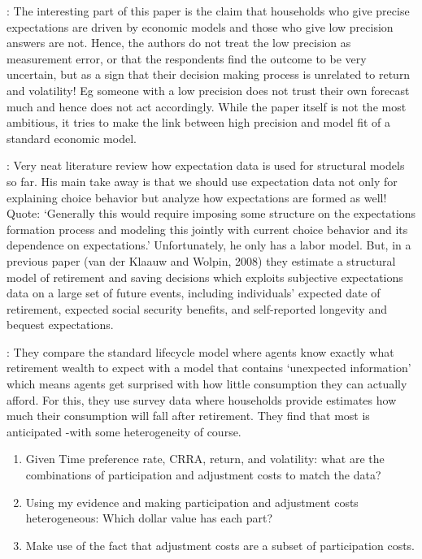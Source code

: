 \documentclass[ProjectABM]{subfiles}
\begin{document}
\cite{DEvG2017_subjective}:
The interesting part of this paper is the claim that households who give precise expectations are driven by economic models and those who give low precision answers are not. Hence, the authors do not treat the low precision as measurement error, or that the respondents find the outcome to be very uncertain, but as a sign that their decision making process is unrelated to return and volatility! Eg someone with a low precision does not trust their own forecast much and hence does not act accordingly. While the paper itself is not the most ambitious, it tries to make the link between high precision and model fit of a standard economic model. 

\cite{vanderKlaauw2012_expectation}: Very neat literature review how expectation data is used for structural models so far. His main take away is that we should use expectation data not only for explaining choice behavior but analyze how expectations are formed as well! Quote: ‘Generally this would require imposing some structure on the expectations formation process and modeling this jointly with current choice behavior and its dependence on expectations.’
Unfortunately, he only has a labor model. But, in a previous paper (van der Klaauw and Wolpin, 2008) they estimate a structural model of retirement and saving decisions which exploits subjective expectations data on a large set of future events, including individuals’ expected date of retirement, expected social security benefits, and self-reported longevity and bequest expectations.

\cite{ACL2007_retirement}: They compare the standard lifecycle model where agents know exactly what retirement wealth to expect with a model that contains ‘unexpected information’ which means agents get surprised with how little consumption they can actually afford. For this, they use survey data where households provide estimates how much their consumption will fall after retirement. They find that most is anticipated -with some heterogeneity of course. 
	
\begin{enumerate}
	\item Given Time preference rate, CRRA, return, and volatility: what are the combinations of participation and adjustment costs to match the data?
	\item Using my evidence and making participation and adjustment costs heterogeneous: Which dollar value has each part?
	\item Make use of the fact that adjustment costs are a subset of participation costs.
\end{enumerate}



\onlyinsubfile{}
%
\end{document}
